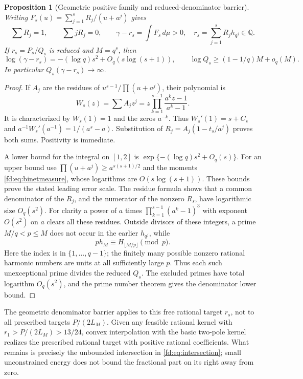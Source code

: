 \documentclass[11pt,a4paper]{article}
\newcommand{\Q}{\mathbb Q}
\newtheorem{proposition}[theorem]{Proposition}
\theoremstyle{definition}
\theoremstyle{remark}
\numberwithin{equation}{section}
\begin{document}
\begin{proposition}[Geometric positive family and reduced-denominator barrier]
\label{fd:prop:geometric}
Writing $F_s(u)=\sum_{j=1}^sR_j/(u+a^j)$ gives
\[
 \sum R_j=1,\qquad \sum jR_j=0,
 \qquad \gamma-r_s=\int F_s\,d\mu>0,
 \quad r_s=\sum_{j=1}^sR_jh_{q^j}\in\Q.
\]
If $r_s=P_s/Q_s$ is reduced and $M=q^s$, then
\[
 \log(\gamma-r_s)=-(\log q)s^2+O_q(s\log(s+1)),\qquad
 \log Q_s\ge(1-1/q)M+o_q(M).
\]
In particular $Q_s(\gamma-r_s)\to\infty$.
\end{proposition}
\begin{proof}
If $A_j$ are the residues of $u^{s-1}/\prod(u+a^j)$, their polynomial is
\[
 W_s(z)=\sum A_jz^j=z\prod_{k=1}^{s-1}\frac{a^kz-1}{a^k-1}.
\]
It is characterized by $W_s(1)=1$ and the zeros $a^{-k}$.
Thus $W_s'(1)=s+C_s$ and
$a^{-1}W_s'(a^{-1})=1/(a^s-a)$.  Substitution of
$R_j=A_j(1-t_s/a^j)$ proves both sums.  Positivity is immediate.

A lower bound for the integral on $[1,2]$ is
$\exp\{-(\log q)s^2+O_q(s)\}$.
For an upper bound use $\prod(u+a^j)\ge a^{s(s+1)/2}$ and the moments
\eqref{fd:eq:binetmeasure}, whose logarithms are $O(s\log(s+1))$.
These bounds prove the stated leading error scale.
The residue formula shows that a common denominator of the $R_j$, and
the numerator of the nonzero $R_s$, have logarithmic size $O_q(s^2)$.
For clarity a power of $a$ times
$\prod_{k=1}^{s-1}(a^k-1)^3$ with exponent $O(s^2)$ on $a$ clears all
these residues.  Outside divisors of these integers, a prime
$M/q<p\le M$ does not occur in the earlier $h_{q^j}$, while
\[
 p h_M\equiv H_{\lfloor M/p\rfloor}\pmod p.
\]
Here the index is in $\{1,\ldots,q-1\}$; the finitely many possible
nonzero rational harmonic numbers are units at all sufficiently large
$p$.  Thus each such unexceptional prime divides the reduced $Q_s$.
The excluded primes have total logarithm $O_q(s^2)$, and the prime
number theorem gives the denominator lower bound.
\end{proof}

The geometric denominator barrier applies to this free rational target
$r_s$, not to all prescribed targets $P/(2L_M)$.  Given any feasible
rational kernel with $r_1>P/(2L_M)>13/24$, convex interpolation with
the basic two-pole kernel realizes the prescribed rational target with
positive rational coefficients.  What remains is precisely the
unbounded intersection in \eqref{fd:eq:intersection}; small unconstrained
energy does not bound the fractional part on its right away from zero.
\end{document}
